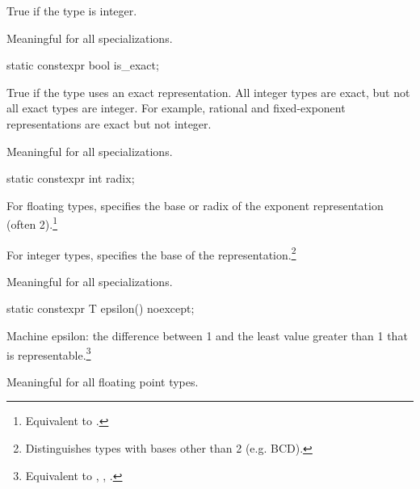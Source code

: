 \begin{itemdescr}
\pnum
True if the type is integer.

\pnum
Meaningful for all specializations.
\end{itemdescr}

\begin{itemdecl}
static constexpr bool is_exact;
\end{itemdecl}

\begin{itemdescr}
\pnum
True if the type uses an exact representation.
All integer types are exact, but not all exact types are integer.
For example, rational and fixed-exponent representations are exact but not integer.

\pnum
Meaningful for all specializations.
\end{itemdescr}

\begin{itemdecl}
static constexpr int radix;
\end{itemdecl}

\begin{itemdescr}
\pnum
For floating types, specifies the base or radix of the exponent representation
(often 2).\footnote{Equivalent to .}

\pnum
For integer types, specifies the base of the
representation.\footnote{Distinguishes types with bases other than 2 (e.g.
BCD).}

\pnum
Meaningful for all specializations.
\end{itemdescr}

\begin{itemdecl}
static constexpr T epsilon() noexcept;
\end{itemdecl}

\begin{itemdescr}
\pnum
Machine epsilon:  the difference between 1 and the least value greater than 1
that is representable.\footnote{Equivalent to , , .}

\pnum
Meaningful for all floating point types.
\end{itemdescr}

